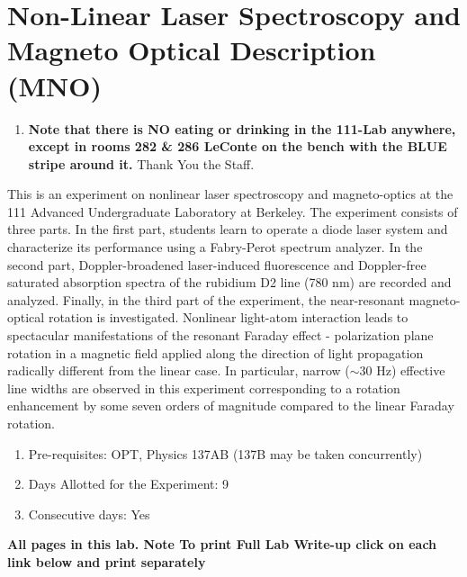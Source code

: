 \documentclass{../lab}
\begin{document}
\maketitle

\tableofcontents

\section{Non-Linear Laser Spectroscopy and Magneto Optical Description (MNO)}

\begin{enumerate}
    \item \textbf{Note that there is NO eating or drinking in the 111-Lab anywhere, except in rooms 282 \& 286 LeConte on the bench with the BLUE stripe around it.} Thank You the Staff.

\end{enumerate}

This is an experiment on nonlinear laser spectroscopy and magneto-optics at the 111 Advanced Undergraduate Laboratory at Berkeley. The experiment consists of three parts. In the first part, students learn to operate a diode laser system and characterize its performance using a Fabry-Perot spectrum analyzer. In the second part, Doppler-broadened laser-induced fluorescence and Doppler-free saturated absorption spectra of the rubidium D2 line (780 nm) are recorded and analyzed. Finally, in the third part of the experiment, the near-resonant magneto-optical rotation is investigated. Nonlinear light-atom interaction leads to spectacular manifestations of the resonant Faraday effect - polarization plane rotation in a magnetic field applied along the direction of light propagation radically different from the linear case. In particular, narrow ($\sim$30 Hz) effective line widths are observed in this experiment corresponding to a rotation enhancement by some seven orders of magnitude compared to the linear Faraday rotation.

\begin{enumerate}
    \item Pre-requisites: OPT, Physics 137AB (137B may be taken concurrently)

    \item Days Allotted for the Experiment: 9

    \item Consecutive days: Yes

\end{enumerate}

\noindent\textbf{All pages in this lab. Note To print Full Lab Write-up click on each link below and print separately }
\end{document}

